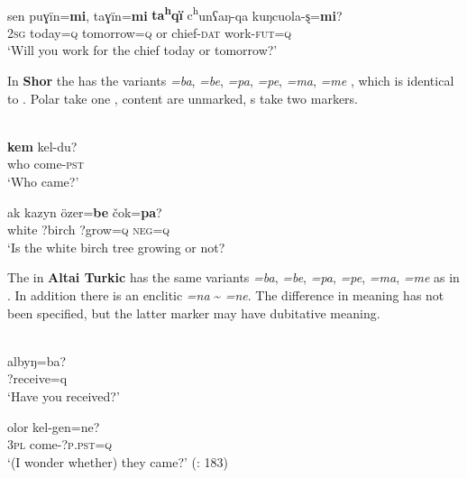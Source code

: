 \ea%
    \label{ex:turk:54}
    \\
    \gll sen  puɣïn=\textbf{{mi}},  taɣïn=\textbf{{mi}} \textbf{{ta}}\textbf{{\textsuperscript{h}}}\textbf{{qï}} {c\textsuperscript{h}}unʕaŋ-qa  kuŋcuola-ȿ=\textbf{{mi}}?\\
    2\textsc{sg}  today=\textsc{q}  tomorrow=\textsc{q}  or  chief-\textsc{dat}  work-\textsc{fut}=\textsc{q}\\
    \glt ‘Will you work for the chief today or tomorrow?’ \citep[152]{Roos2000}
    \z

In \textbf{Shor} the  has the variants \textit{=ba}, \textit{=be}, \textit{=pa}, \textit{=pe}, \textit{=ma}, \textit{=me} \citep[505]{Donidze1997}, which is identical to . Polar  take one \citep[291]{Nevskaja2000}, content  are unmarked, s take two markers.

\ea%
    \label{ex:turk:55}
    \\
    \ea
    \gll \textbf{{kem}} kel-du?\\
    who  come-\textsc{pst}\\
    \glt ‘Who came?’
    
    \ex
    \gll ak  kazyn  özer=\textbf{be} {čok=}\textbf{{pa}}?\\
    white  ?birch  ?grow=\textsc{q}  \textsc{neg=q}\\
    \glt ‘Is the white birch tree growing or not? \citep[505]{Donidze1997}
    \z
    \z

The  in \textbf{Altai Turkic} has the same variants \textit{=ba}, \textit{=be}, \textit{=pa}, \textit{=pe}, \textit{=ma}, \textit{=me} as in  \citep[183]{Baskakov1997}. In addition there is an enclitic \textit{=na} {\textasciitilde} \textit{=ne}. The difference in meaning has not been specified, but the latter marker may have dubitative meaning.

\ea%
    \label{ex:turk:56}
    \\
    \ea
    \gll albyŋ=ba?\\
    ?receive=q\\
    \glt ‘Have you received?’
    
    \ex
    \gll olor  kel-gen=ne?\\
    3\textsc{pl}  come-?\textsc{p.pst}=\textsc{q}\\
    \glt ‘(I wonder whether) they came?’ (\citealt{Baskakov1997}: 183)
    \z
    \z

